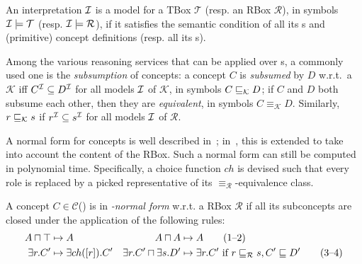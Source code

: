 An interpretation \(\mathcal{I}\) is a model for a TBox \(\mathcal{T}\) (resp. an RBox \(\mathcal{R}\)), in symbols \(\mathcal{I} \models \mathcal{T}\) (resp. \(\mathcal{I} \models \mathcal{R}\)), if it satisfies the semantic condition of all its \gci{}s and (primitive) concept definitions (resp. all its \ria{}s).

Among the various reasoning services that can be applied over \elh \kb{}s, a commonly used one is the \emph{subsumption} of concepts: a concept \(C\) is \emph{subsumed} by \(D\) w.r.t.\ a \kb \(\mathcal{K}\) iff \(C^{\mathcal{I}} \subseteq D^{\mathcal{I}}\) for all models \(\mathcal{I}\) of \(\mathcal{K}\), in symbols \(C \sqsubseteq_{\mathcal{K}} D\); if \(C\) and \(D\) both subsume each other, then they are \emph{equivalent}, in symbols \(C \equiv_{\mathcal{K}} D\).
Similarly, \(r \sqsubseteq_{\mathcal{K}} s\) if \(r^{\mathcal{I}} \subseteq s^{\mathcal{I}}\) for all models \(\mathcal{I}\) of \(\mathcal{R}\).

A normal form for \el concepts is well described in~\cite{DLbook}; in~\cite{LeTu12}, this is extended to take into account the content of the RBox.
Such a normal form can still be computed in polynomial time.
Specifically, a choice function \(ch{}\) is devised such that every role is replaced by a picked representative of its \(\equiv_\mathcal{R}\)-equivalence class.
\begin{definition}
  \label{dfn:elh-nf}
  A concept \(C \in \mathcal{C}\)(\elh) is in \emph{\elh-normal form} w.r.t. a RBox \(\mathcal{R}\) if all its subconcepts are closed under the application of the following rules:
  \begin{align*}
    A \sqcap \top &\mapsto A & A \sqcap A &\mapsto A \tag{1--2}\\
    \exists{}r.C^\prime &\mapsto \exists{}ch([r]).C^\prime &
    \exists{}r.C^\prime \sqcap \exists{}s.D^\prime &\mapsto
    \exists{}r.C^\prime\,\,\text{if}\,\,r\sqsubseteq_{\mathcal{R}}s, C^\prime \sqsubseteq D^\prime \tag{3--4}
  \end{align*}
\end{definition}